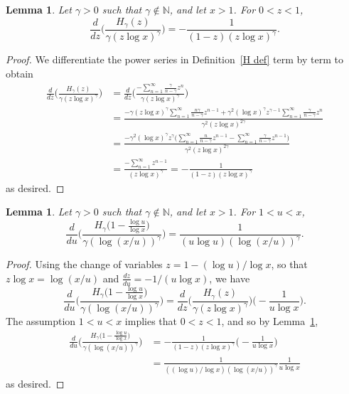 \documentclass[12pt,reqno]{amsart}
\newtheorem{lemma}[theorem]{Lemma}
\theoremstyle{definition}
\newcommand{\N}{{\mathbb N}}
\begin{document}
\begin{lemma} \label{indefint lemma}
Let $\gamma>0$ such that $\gamma\not\in\N$, and let $x>1$. For $0<z<1$,
\[
\frac d{dz}\bigg( \frac{H_\gamma(z)}{\gamma(z\log x)^\gamma} \bigg) = -\frac 1{(1-z)(z\log x)^\gamma}.
\]
\end{lemma}

\begin{proof}
We differentiate the power series in Definition~\ref{H def} term by term to obtain
\begin{align*}
\frac d{dz}\bigg( \frac{H_\gamma(z)}{\gamma(z\log x)^\gamma} \bigg)&=\frac d{dz}\bigg( \frac{-\sum_{n=1}^\infty \frac \gamma{n-\gamma}z^n}{\gamma(z\log x)^\gamma} \bigg)\\
&=\frac{-\gamma(z\log x)^\gamma\sum_{n=1}^\infty \frac {n\gamma}{n-\gamma}z^{n-1}+\gamma^2(\log x)^\gamma z^{\gamma-1}\sum_{n=1}^\infty \frac \gamma{n-\gamma}z^n}{\gamma^2(z\log x)^{2\gamma}}\\
&=\frac{-\gamma^2(\log x)^\gamma z^\gamma\big( \sum_{n=1}^\infty \frac {n}{n-\gamma}z^{n-1}-\sum_{n=1}^\infty \frac \gamma{n-\gamma}z^{n-1} \big)}{\gamma^2(z\log x)^{2\gamma}}\\
&=\frac{-\sum_{n=1}^\infty z^{n-1}}{(z\log x)^\gamma} = -\frac 1{(1-z)(z\log x)^\gamma}
\end{align*}
as desired.
\end{proof}

\begin{lemma} \label{indefint}
Let $\gamma>0$ such that $\gamma\not\in\N$, and let $x>1$. For $1<u<x$,
\[
\frac d{du}\bigg( \frac{H_\gamma\big(1-\frac{\log u}{\log x}\big)}{\gamma(\log(x/u))^\gamma} \bigg) = \frac 1{(u\log u)(\log(x/u))^\gamma}.
\]
\end{lemma}

\begin{proof}
Using the change of variables $z=1-(\log u)/\log x$, so that $z\log x=\log(x/u)$ and $\frac{dz}{du} = -1/(u\log x)$, we have
\[
\frac d{du}\bigg( \frac{H_\gamma\big(1-\frac{\log u}{\log x}\big)}{\gamma(\log(x/u))^\gamma} \bigg) = \frac d{dz}\bigg( \frac{H_\gamma(z)}{\gamma(z\log x)^\gamma} \bigg) \bigg( {-}\frac 1{u\log x} \bigg).
\]
The assumption $1<u<x$ implies that $0<z<1$, and so by Lemma~\ref{indefint lemma},
\begin{align*}
\frac d{du}\bigg( \frac{H_\gamma\big(1-\frac{\log u}{\log x}\big)}{\gamma(\log(x/u))^\gamma} \bigg) &= -\frac 1{(1-z)(z\log x)^\gamma} \bigg( {-}\frac 1{u\log x} \bigg) \\
&= \frac 1{((\log u)/\log x)(\log(x/u))^\gamma} \frac 1{u\log x}
\end{align*}
as desired.
\end{proof}
\end{document}
